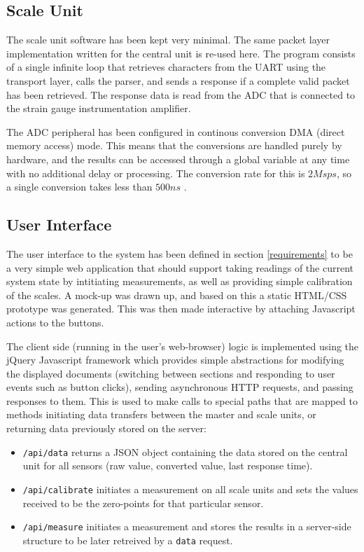 \subsection{Scale Unit}
The scale unit software has been kept very minimal. The same packet layer implementation written for the central unit is re-used here. The program consists of a single infinite loop that retrieves characters from the UART using the transport layer, calls the parser, and sends a response if a complete valid packet has been retrieved. The response data is read from the ADC that is connected to the strain gauge instrumentation amplifier.

The ADC peripheral has been configured in continous conversion DMA (direct memory access) mode. This means that the conversions are handled purely by hardware, and the results can be accessed through a global variable at any time with no additional delay or processing. The conversion rate for this is $2\unit{Msps}$, so a single conversion takes less than $500\unit{ns}$ \cite[page 125]{stm32f4-trm}.


\subsection{User Interface}
The user interface to the system has been defined in section \ref{requirements} to be a very simple web application that should support taking readings of the current system state by intitiating measurements, as well as providing simple calibration of the scales. A mock-up was drawn up, and based on this a static HTML/CSS prototype was generated. This was then made interactive by attaching Javascript actions to the buttons.

The client side (running in the user's web-browser) logic is implemented using the jQuery Javascript framework \cite{jquery} which provides simple abstractions for modifying the displayed documents (switching between sections and responding to user events such as button clicks), sending asynchronous HTTP requests, and passing responses to them. This is used to make calls to special paths that are mapped to methods initiating data transfers between the master and scale units, or returning data previously stored on the server:

\begin{itemize}
	\item \texttt{/api/data} returns a JSON \cite{json-spec} object containing the data stored on the central unit for all sensors (raw value, converted value, last response time).
	\item \texttt{/api/calibrate} initiates a measurement on all scale units and sets the values received to be the zero-points for that particular sensor.
	\item \texttt{/api/measure} initiates a measurement and stores the results in a server-side structure to be later retreived by a \texttt{data} request.
\end{itemize}

